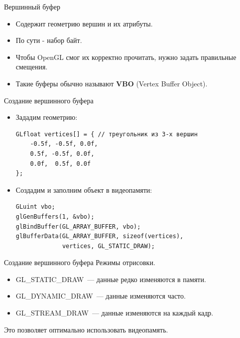 \documentclass[aspectration=1610,t]{beamer}
\begin{document}
\begin{frame}[fragile]{Вершинный буфер}
    \begin{itemize}
        \item Содержит геометрию вершин и их атрибуты.
        \item По сути - набор байт.
        \item Чтобы OpenGL смог их корректно прочитать, нужно задать правильные смещения.
        \item Такие буферы обычно называют {\bf VBO} (Vertex Buffer Object).
    \end{itemize}
\end{frame}

\begin{frame}[fragile]{Создание вершинного буфера}
    \begin{itemize}
        \item Зададим геометрию:
            {\small \begin{lstlisting}
GLfloat vertices[] = { // треугольник из 3-х вершин
    -0.5f, -0.5f, 0.0f,
    0.5f, -0.5f, 0.0f,
    0.0f,  0.5f, 0.0f
};
            \end{lstlisting}}
        \item Создадим и заполним объект в видеопамяти:
            {\small \begin{lstlisting}
GLuint vbo;
glGenBuffers(1, &vbo);
glBindBuffer(GL_ARRAY_BUFFER, vbo);
glBufferData(GL_ARRAY_BUFFER, sizeof(vertices),
             vertices, GL_STATIC_DRAW);
            \end{lstlisting}}
    \end{itemize}
\end{frame}

\begin{frame}[fragile]{Создание вершинного буфера}
    Режимы отрисовки.
    \begin{itemize}
        \item GL\_STATIC\_DRAW~--- данные редко изменяются в памяти.
        \item GL\_DYNAMIC\_DRAW~--- данные изменяются часто.
        \item GL\_STREAM\_DRAW~--- данные изменяются на каждый кадр.
    \end{itemize}
    Это позволяет оптимально использовать видеопамять.
\end{frame}
\end{document}
